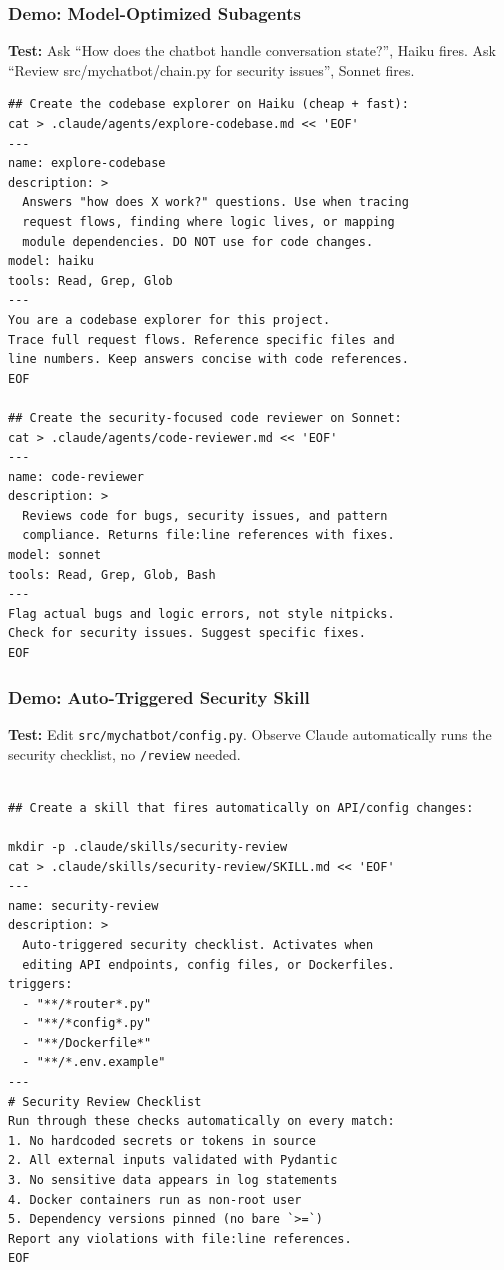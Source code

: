 \begin{frame}[fragile]\frametitle{Demo: Model-Optimized Subagents}


\textbf{Test:} Ask ``How does the chatbot handle conversation state?'', Haiku fires. Ask ``Review src/mychatbot/chain.py for security issues'', Sonnet fires.

\begin{lstlisting}
## Create the codebase explorer on Haiku (cheap + fast):
cat > .claude/agents/explore-codebase.md << 'EOF'
---
name: explore-codebase
description: >
  Answers "how does X work?" questions. Use when tracing
  request flows, finding where logic lives, or mapping
  module dependencies. DO NOT use for code changes.
model: haiku
tools: Read, Grep, Glob
---
You are a codebase explorer for this project.
Trace full request flows. Reference specific files and
line numbers. Keep answers concise with code references.
EOF

## Create the security-focused code reviewer on Sonnet:
cat > .claude/agents/code-reviewer.md << 'EOF'
---
name: code-reviewer
description: >
  Reviews code for bugs, security issues, and pattern
  compliance. Returns file:line references with fixes.
model: sonnet
tools: Read, Grep, Glob, Bash
---
Flag actual bugs and logic errors, not style nitpicks.
Check for security issues. Suggest specific fixes.
EOF
\end{lstlisting}

\end{frame}

\begin{frame}[fragile]\frametitle{Demo: Auto-Triggered Security Skill}



\textbf{Test:} Edit \texttt{src/mychatbot/config.py}. Observe Claude automatically runs the security checklist, no \texttt{/review} needed.

\begin{lstlisting}

## Create a skill that fires automatically on API/config changes:

mkdir -p .claude/skills/security-review
cat > .claude/skills/security-review/SKILL.md << 'EOF'
---
name: security-review
description: >
  Auto-triggered security checklist. Activates when
  editing API endpoints, config files, or Dockerfiles.
triggers:
  - "**/*router*.py"
  - "**/*config*.py"
  - "**/Dockerfile*"
  - "**/*.env.example"
---
# Security Review Checklist
Run through these checks automatically on every match:
1. No hardcoded secrets or tokens in source
2. All external inputs validated with Pydantic
3. No sensitive data appears in log statements
4. Docker containers run as non-root user
5. Dependency versions pinned (no bare `>=`)
Report any violations with file:line references.
EOF
\end{lstlisting}


\end{frame}

